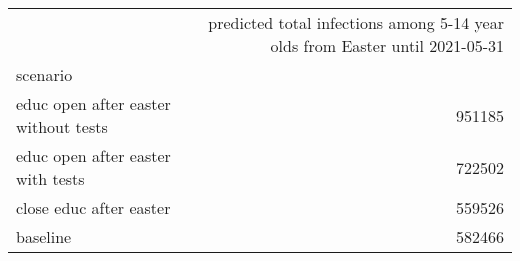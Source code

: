 \begin{tabular}{lr}
\toprule
{} &  predicted total infections among 5-14 year olds from Easter until 2021-05-31 \\
scenario                               &                                                                               \\
\midrule
 educ open after easter  without tests &                                             951185 \\
 educ open after easter  with tests    &                                             722502 \\
 close educ after easter               &                                             559526 \\
 baseline                              &                                             582466 \\
\bottomrule
\end{tabular}
